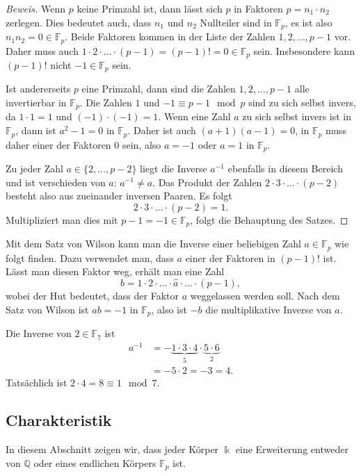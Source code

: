 \begin{proof}[Beweis]
Wenn $p$ keine Primzahl ist, dann lässt sich $p$ in Faktoren
$p=n_1\cdot n_2$ zerlegen.
Dies bedeutet auch, dass $n_1$ und $n_2$ Nullteiler sind in
$\mathbb{F}_p$, es ist also $n_1n_2=0\in\mathbb{F}_p$.
Beide Faktoren kommen in der Liste der Zahlen $1,2,\dots,p-1$ vor.
Daher muss auch $1\cdot2\cdot\dots\cdot(p-1)=(p-1)!=0\in\mathbb{F}_p$ sein.
Insbesondere kann $(p-1)!$ nicht $-1\in\mathbb{F}_p$ sein.

Ist andererseits $p$ eine Primzahl, dann sind die Zahlen $1, 2,\dots,p-1$
alle invertierbar in $\mathbb{F}_p$.
Die Zahlen $1$ und $-1\equiv p-1\mod p$ sind zu sich selbst invers,
da $1\cdot 1=1$ und $(-1)\cdot(-1)=1$.
Wenn eine Zahl $a$ zu sich selbst invers ist in $\mathbb{F}_p$,
dann ist $a^2-1=0$ in $\mathbb{F}_p$.
Daher ist auch $(a+1)(a-1)=0$, in $\mathbb{F}_p$ muss daher einer
der Faktoren $0$ sein, also $a=-1$ oder $a=1$ in $\mathbb{F}_p$.

Zu jeder Zahl $a\in\{2,\dots,p-2\}$ liegt die Inverse $a^{-1}$
ebenfalls in diesem Bereich und ist verschieden von $a$: $a^{-1}\ne a$.
Das Produkt der Zahlen
$2\cdot 3 \cdot\ldots\cdot (p-2)$ besteht also aus zueinander inversen
Paaren.
Es folgt
\[
2\cdot 3 \cdot\ldots\cdot (p-2) = 1.
\]
Multipliziert man dies mit $p-1=-1\in\mathbb{F}_p$, folgt
die Behauptung des Satzes.
\end{proof}

Mit dem Satz von Wilson kann man die Inverse einer beliebigen Zahl
$a\in\mathbb{F}_p$ wie folgt finden.
Dazu verwendet man, dass $a$ einer der Faktoren in $(p-1)!$ ist.
Lässt man diesen Faktor weg, erhält man eine Zahl
\[
b = 1\cdot 2 \cdot \ldots\cdot \hat{a}\cdot\ldots\cdot (p-1),
\]
wobei der Hut bedeutet, dass der Faktor $a$ weggelassen werden soll.
Nach dem Satz von Wilson ist $ab=-1$ in $\mathbb{F}_p$, also ist
$-b$ die multiplikative Inverse  von $a$.

\begin{beispiel}
Die Inverse von $2\in\mathbb{F}_7$ ist
\begin{align*}
a^{-1}
&=
-\underbrace{1\cdot 3\cdot 4}_{5}\cdot \underbrace{5\cdot 6}_{2}
\\
&=
-5\cdot 2
=
-3
=4.
\end{align*}
Tatsächlich ist $2\cdot 4=8\equiv 1\mod 7$.
\end{beispiel}

%
%
\subsection{Charakteristik
\label{buch:subsection:charakteristik}}
In diesem Abschnitt zeigen wir, dass jeder Körper $\Bbbk$ eine Erweiterung
entweder von $\mathbb{Q}$ oder eines endlichen Körpers $\mathbb{F}_p$ ist.

